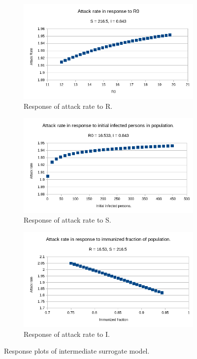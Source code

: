 \begin{figure}
    \begin{subfigure}{0.9\textwidth}
        \includegraphics[width=0.8\linewidth]{figures/responseR.png}
        \caption{Response of attack rate to R.}
    \end{subfigure}
    \begin{subfigure}{0.9\textwidth}
        \includegraphics[width=0.8\linewidth]{figures/responseS.png}
        \caption{Response of attack rate to S.}
    \end{subfigure}
        \begin{subfigure}{0.9\textwidth}
        \includegraphics[width=0.8\linewidth]{figures/responseI.png}
        \caption{Response of attack rate to I.}
    \end{subfigure}
    \caption{Response plots of intermediate surrogate model.}
    \label{fig:usecaseresponseplots}
\end{figure}
